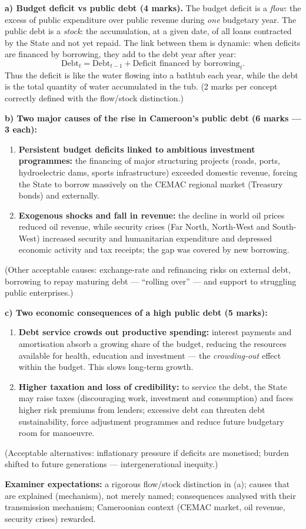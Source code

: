 \documentclass[11pt]{article}
\newcommand{\cle}[1]{{\popxbold\color{popdark}#1}}
\begin{document}
\begin{corrige}
\textbf{a) Budget deficit vs public debt (4 marks).}
The \cle{budget deficit} is a \emph{flow}: the excess of public expenditure over public revenue during \emph{one} budgetary year. The \cle{public debt} is a \emph{stock}: the accumulation, at a given date, of all loans contracted by the State and not yet repaid. The link between them is dynamic: when deficits are financed by borrowing, they add to the debt year after year:
\[ \text{Debt}_t = \text{Debt}_{t-1} + \text{Deficit financed by borrowing}_t . \]
Thus the deficit is like the water flowing into a bathtub each year, while the debt is the total quantity of water accumulated in the tub. (2 marks per concept correctly defined with the flow/stock distinction.)

\textbf{b) Two major causes of the rise in Cameroon's public debt (6 marks — 3 each):}
\begin{enumerate}
\item \textbf{Persistent budget deficits linked to ambitious investment programmes:} the financing of major structuring projects (roads, ports, hydroelectric dams, sports infrastructure) exceeded domestic revenue, forcing the State to borrow massively on the CEMAC regional market (Treasury bonds) and externally.
\item \textbf{Exogenous shocks and fall in revenue:} the decline in world oil prices reduced oil revenue, while security crises (Far North, North-West and South-West) increased security and humanitarian expenditure and depressed economic activity and tax receipts; the gap was covered by new borrowing.
\end{enumerate}
(Other acceptable causes: exchange-rate and refinancing risks on external debt, borrowing to repay maturing debt — ``rolling over'' — and support to struggling public enterprises.)

\textbf{c) Two economic consequences of a high public debt (5 marks):}
\begin{enumerate}
\item \textbf{Debt service crowds out productive spending:} interest payments and amortisation absorb a growing share of the budget, reducing the resources available for health, education and investment — the \emph{crowding-out} effect within the budget. This slows long-term growth.
\item \textbf{Higher taxation and loss of credibility:} to service the debt, the State may raise taxes (discouraging work, investment and consumption) and faces higher risk premiums from lenders; excessive debt can threaten debt sustainability, force adjustment programmes and reduce future budgetary room for manoeuvre.
\end{enumerate}
(Acceptable alternatives: inflationary pressure if deficits are monetised; burden shifted to future generations — intergenerational inequity.)

\textbf{Examiner expectations:} a rigorous flow/stock distinction in (a); causes that are explained (mechanism), not merely named; consequences analysed with their transmission mechanism; Cameroonian context (CEMAC market, oil revenue, security crises) rewarded.
\end{corrige}
\end{document}
